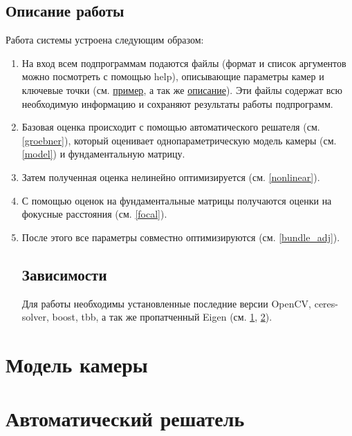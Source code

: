 \section{Описание работы}
Работа системы устроена следующим образом:
\begin{enumerate}
	\item На вход всем подпрограммам подаются файлы (формат и список аргументов можно посмотреть с помощью help), описывающие параметры камер и ключевые точки (см. \href{https://github.com/QuantumMechanicus/camera_calibration/blob/dev/pipeline/bin/A_data/552.data}{пример}, а так же \href{https://github.com/QuantumMechanicus/camera_calibration/blob/dev/README.md}{описание}). Эти файлы содержат всю необходимую информацию и сохраняют результаты работы подпрограмм.
	\item Базовая оценка происходит с помощью автоматического решателя (см. \ref{groebner}), который оценивает однопараметрическую модель камеры (см. \ref{model}) и фундаментальную матрицу.
	\item Затем полученная оценка нелинейно оптимизируется (см. \ref{nonlinear}).
	\item С помощью оценок на фундаментальные матрицы получаются оценки на фокусные расстояния (см. \ref{focal}).
	\item После этого все параметры совместно оптимизируются (см. \ref{bundle_adj}).

\section{Зависимости}
Для работы необходимы установленные последние версии OpenCV, ceres-solver, boost, tbb, а так же пропатченный Eigen (см. \href{https://bitbucket.org/dkorchemkin/eigen/commits/6e3f920c0f5e3e64f3952d6b8589ee74e38f8bef}{1}, \href{https://bitbucket.org/dkorchemkin/eigen/commits/27696f4148ffc4aadaa7871d1900aaac4db51937}{2}).  

	

\end{enumerate}
	
\chapter{Модель камеры}



\chapter{Автоматический решатель}


